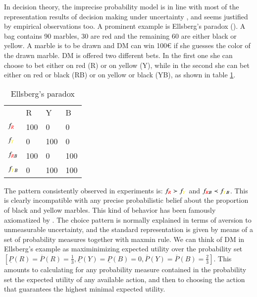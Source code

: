 \documentclass[fleqn,reqno,12pt]{article}
\theoremstyle{Satz}
\theoremstyle{Bsp}
\begin{document}
In decision theory, the imprecise probability model is in line with most of the representation
results of decision making under uncertainty \citep[e.g.,][]{gilsch89,KlibMarMuk05,GhirMar02},
and seems justified by empirical observations too. A prominent example is Ellsberg's paradox
(\citet{ells61}). A bag contains 90 marbles, 30 are red and the remaining 60 are either black
or yellow. A marble is to be drawn and DM can win 100€ if she guesses the color of the drawn
marble. DM is offered two different bets. In the first one she can choose to bet either on
red (R) or on yellow (Y), while in the second she can bet either on red or black (RB) or on
yellow or black (YB), as shown in table \ref{Ellsberg}.



\begin{table}[h]
\centering
\begin{tabular}{@{}llll@{}}
\cmidrule(l){2-4}
\multicolumn{1}{c}{} & {\color{red}R}   & {\color{yellow}Y}   & B   \\ \cmidrule(l){2-4} 
$f_{{\color{red}R}}$              & 100 & 0   & 0   \\
$f_{{\color{yellow}Y}}$              & 0   & 100 & 0   \\
$f_{{\color{red}R}B}$            & 100 & 0   & 100 \\
$f_{{\color{yellow}Y}B}$             & 0   & 100 & 100 \\ \bottomrule
\end{tabular}
\caption{Ellsberg's paradox}
\label{Ellsberg}
\end{table}

The pattern consistently observed in experiments is:
$f_{{\color{red}R}} \succ f_{{\color{yellow}Y}}$ and
$f_{{\color{red}R}B} \prec f_{{\color{yellow}Y}B}$. This is clearly incompatible with any
precise probabilistic belief about the proportion of black and yellow marbles. This kind of
behavior has been famously axiomatized by \citet{gilsch89}. The
choice pattern is normally explained in terms of aversion to unmeasurable uncertainty, and the standard
representation is given by means of a set of probability measures together with maxmin rule. We
can think of DM in Ellsberg's example as maximinimizing expected utility over the
probability set
$
[\underline{P}(R)=\overline{P}(R)=\frac{1}{3}, \underline{P}(Y)= \underline{P}(B)=0, \overline{P}(Y)= \overline{P}(B)=\frac{2}{3}]
$.
This amounts to calculating for any probability measure contained in the probability set the
expected utility of any available action, and then to choosing the action that guarantees the
highest minimal expected utility. 
\end{document}
